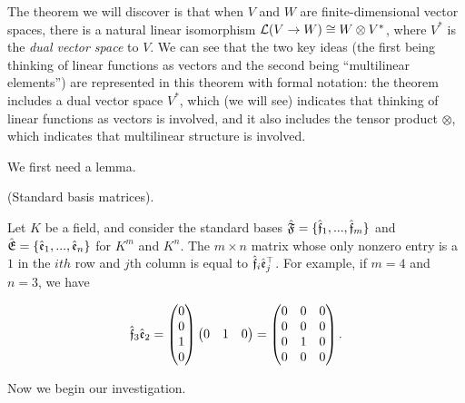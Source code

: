 The theorem we will discover is that when $V$ and $W$ are finite-dimensional vector spaces, there is a natural linear isomorphism $\mathcal{L}(V \rightarrow W) \cong W \otimes V^*$, where $V^*$ is the \textit{dual vector space} to $V$. We can see that the two key ideas (the first being thinking of linear functions as vectors and the second being ``multilinear elements'') are represented in this theorem with formal notation: the theorem includes a dual vector space $V^*$, which (we will see) indicates that thinking of linear functions as vectors is involved, and it also includes the tensor product $\otimes$, which indicates that multilinear structure is involved.

We first need a lemma.

\begin{lemma}
    (Standard basis matrices).

    Let $K$ be a field, and consider the standard bases ${\hat{\mathfrak{F}}} = \{ \hat{\mathfrak{f}}_1, ..., \hat{\mathfrak{f}}_m\}$ and ${\hat{\mathfrak{E}}} = \{\hat{\mathfrak{e}}_1, ..., \hat{\mathfrak{e}}_n\}$ for $K^m$ and $K^n$. The $m \times n$ matrix whose only nonzero entry is a $1$ in the $ith$ row and $j$th column is equal to $\hat{\mathfrak{f}}_i \hat{\mathfrak{e}}_j^\top$. For example, if $m = 4$ and $n = 3$, we have

    \begin{align*}
        \hat{\mathfrak{f}}_3 \hat{\mathfrak{e}}_2 = 
        \begin{pmatrix}
            0 \\
            0 \\
            1 \\
            0
        \end{pmatrix}
        \begin{pmatrix}
            0 & 1 & 0
        \end{pmatrix}
        =
        \begin{pmatrix}
            0 & 0 & 0 \\
            0 & 0 & 0 \\
            0 & 1 & 0 \\
            0 & 0 & 0
        \end{pmatrix}.
    \end{align*}
\end{lemma}

Now we begin our investigation.

